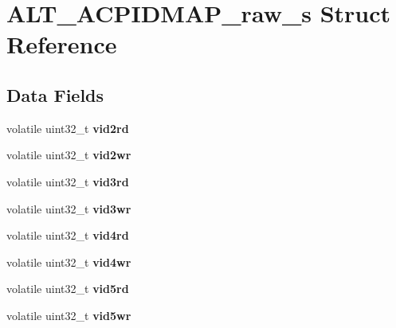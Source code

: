 \hypertarget{structALT__ACPIDMAP__raw__s}{}\section{A\+L\+T\+\_\+\+A\+C\+P\+I\+D\+M\+A\+P\+\_\+raw\+\_\+s Struct Reference}
\label{structALT__ACPIDMAP__raw__s}
\subsection*{Data Fields}
\begin{DoxyCompactItemize}
\item 
\mbox{\label{structALT__ACPIDMAP__raw__s_aa0b1b3c20668bebe018d4f6fce8784b7}} 
volatile uint32\+\_\+t {\bfseries vid2rd}
\item 
\mbox{\label{structALT__ACPIDMAP__raw__s_a850f85ae9e988c3ea05959131800b479}} 
volatile uint32\+\_\+t {\bfseries vid2wr}
\item 
\mbox{\label{structALT__ACPIDMAP__raw__s_a67834059892527ceea980be819ec8403}} 
volatile uint32\+\_\+t {\bfseries vid3rd}
\item 
\mbox{\label{structALT__ACPIDMAP__raw__s_ab71fd6a703f5dd92cf3a626b241ff9a5}} 
volatile uint32\+\_\+t {\bfseries vid3wr}
\item 
\mbox{\label{structALT__ACPIDMAP__raw__s_a5efa0992f2f784fef8f6b9138d887ed0}} 
volatile uint32\+\_\+t {\bfseries vid4rd}
\item 
\mbox{\label{structALT__ACPIDMAP__raw__s_a0ecfcbe239974ffe9b1e59987eb7d6a4}} 
volatile uint32\+\_\+t {\bfseries vid4wr}
\item 
\mbox{\label{structALT__ACPIDMAP__raw__s_a1d245c0fd28abea6b85df6929b5ec0d8}} 
volatile uint32\+\_\+t {\bfseries vid5rd}
\item 
\mbox{\label{structALT__ACPIDMAP__raw__s_a4007b2eb8ee7a1cb6a15267f71e141dc}} 
volatile uint32\+\_\+t {\bfseries vid5wr}
\item 

\end{DoxyCompactItemize}

